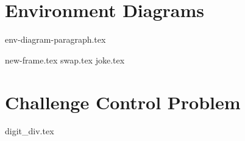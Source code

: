 \documentclass{exam}
\begin{document}
\newpage

\section{Environment Diagrams}
{env-diagram-paragraph.tex}
\begin{questions}
{new-frame.tex}
{swap.tex}
\newpage
{joke.tex}
\end{questions}

\newpage
\section{Challenge Control Problem}
\begin{questions}
{digit_div.tex}

\clearpage

\end{questions}
\end{document}
